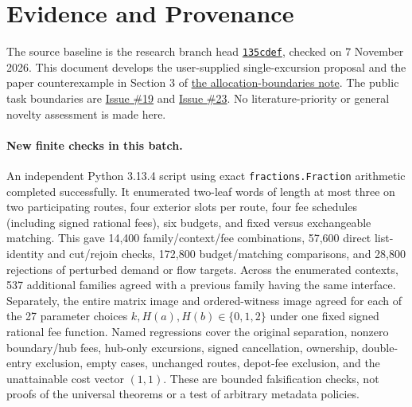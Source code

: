 \documentclass[11pt]{article}
\theoremstyle{remark}
\newcommand{\code}[1]{\nolinkurl{#1}}
\begin{document}
\section*{Evidence and Provenance}
The source baseline is the research branch head
\href{https://github.com/huam54925-cpu/uav-routing-certification/commit/135cdef388c4d091aac78c9dd41cefddd57f202e}{\code{135cdef}},
checked on 7 November 2026. This document develops the user-supplied
single-excursion proposal and the paper counterexample in Section 3 of
\href{https://github.com/huam54925-cpu/uav-routing-certification/blob/135cdef388c4d091aac78c9dd41cefddd57f202e/docs/TREE_BUDGET_ALLOCATION_BOUNDARIES.tex}{the allocation-boundaries note}.
The public task boundaries are
\href{https://github.com/huam54925-cpu/uav-routing-certification/issues/19}{Issue \#19}
and \href{https://github.com/huam54925-cpu/uav-routing-certification/issues/23}{Issue \#23}.
No literature-priority or general novelty assessment is made here.

\paragraph{New finite checks in this batch.}
An independent Python 3.13.4 script using exact \code{fractions.Fraction}
arithmetic completed successfully. It enumerated two-leaf words of length
at most three on two participating routes, four exterior slots per route,
four fee schedules (including signed rational fees), six budgets, and fixed
versus exchangeable matching. This gave 14,400 family/context/fee combinations,
57,600 direct list-identity and cut/rejoin checks, 172,800 budget/matching
comparisons, and 28,800 rejections of perturbed demand or flow targets.
Across the enumerated contexts, 537 additional families agreed with a previous
family having the same interface. Separately, the entire matrix image and
ordered-witness image agreed for each of the 27 parameter choices
$k,H(a),H(b)\in\{0,1,2\}$ under one fixed signed rational fee function.
Named regressions cover the original separation, nonzero boundary/hub fees,
hub-only excursions, signed cancellation, ownership, double-entry exclusion,
empty cases, unchanged routes, depot-fee exclusion, and the unattainable
cost vector $(1,1)$. These are bounded falsification checks, not proofs of
the universal theorems or a test of arbitrary metadata policies.
\end{document}
